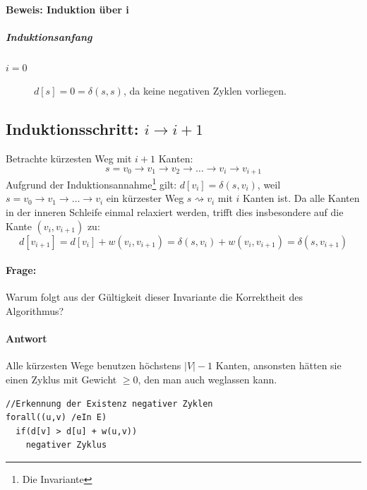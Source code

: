\paragraph{Beweis: Induktion über i}
\subparagraph{Induktionsanfang}
\begin{description}
	\item[$i=0$] $d[s] = 0 = \delta(s,s)$, da keine negativen Zyklen vorliegen.
\end{description}
\subsection{Induktionsschritt:  $i\rightarrow i+1$}
Betrachte kürzesten Weg mit $i+1$ Kanten:
\[ s=v_0\rightarrow v_1\rightarrow v_2\rightarrow\ldots\rightarrow v_i\rightarrow v_{i+1} \]
Aufgrund der Induktionsannahme\footnote{Die Invariante} gilt: $d[v_i] = \delta(s,v_i)$, weil $s=v_0\rightarrow v_1\rightarrow\ldots\rightarrow v_i$ ein kürzester Weg $s\rightsquigarrow v_i$ mit $i$ Kanten ist.
Da alle Kanten in der inneren Schleife einmal relaxiert werden, trifft dies insbesondere auf die Kante $(v_i, v_{i+1})$ zu:
\[ d[v_{i+1}] = d[v_i] + w(v_i, v_{i+1}) = \delta(s, v_i) + w(v_i, v_{i+1}) = \delta(s,v_{i+1}) \]
\paragraph{Frage:}
Warum folgt aus der Gültigkeit dieser Invariante die Korrektheit des Algorithmus?
\paragraph{Antwort}
Alle kürzesten Wege benutzen höchstens $|V|-1$ Kanten, ansonsten hätten sie einen Zyklus mit Gewicht $\geq 0$, den man auch weglassen kann.
\begin{lstlisting}
//Erkennung der Existenz negativer Zyklen
forall((u,v) /eIn E)
  if(d[v] > d[u] + w(u,v))
    negativer Zyklus
\end{lstlisting}